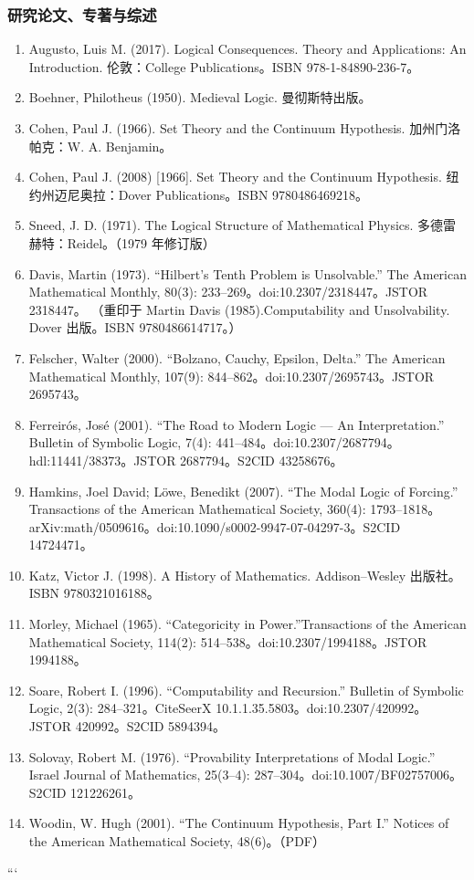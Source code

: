 \subsubsection{研究论文、专著与综述}
\begin{enumerate}
  \item Augusto, Luis M. (2017). Logical Consequences. Theory and Applications: An Introduction. 伦敦：College Publications。ISBN 978-1-84890-236-7。
  \item Boehner, Philotheus (1950). Medieval Logic. 曼彻斯特出版。
  \item Cohen, Paul J. (1966). Set Theory and the Continuum Hypothesis. 加州门洛帕克：W. A. Benjamin。
  \item Cohen, Paul J. (2008) [1966]. Set Theory and the Continuum Hypothesis. 纽约州迈尼奥拉：Dover Publications。ISBN 9780486469218。
  \item Sneed, J. D. (1971). The Logical Structure of Mathematical Physics. 多德雷赫特：Reidel。（1979 年修订版）
  \item Davis, Martin (1973). “Hilbert's Tenth Problem is Unsolvable.” The American Mathematical Monthly, 80(3): 233–269。doi:10.2307/2318447。JSTOR 2318447。  
  （重印于 Martin Davis (1985).Computability and Unsolvability. Dover 出版。ISBN 9780486614717。）
  \item Felscher, Walter (2000). “Bolzano, Cauchy, Epsilon, Delta.” The American Mathematical Monthly, 107(9): 844–862。doi:10.2307/2695743。JSTOR 2695743。
  \item Ferreirós, José (2001). “The Road to Modern Logic — An Interpretation.” Bulletin of Symbolic Logic, 7(4): 441–484。doi:10.2307/2687794。hdl:11441/38373。JSTOR 2687794。S2CID 43258676。
  \item Hamkins, Joel David; Löwe, Benedikt (2007). “The Modal Logic of Forcing.” Transactions of the American Mathematical Society, 360(4): 1793–1818。arXiv:math/0509616。doi:10.1090/s0002-9947-07-04297-3。S2CID 14724471。
  \item Katz, Victor J. (1998). A History of Mathematics. Addison–Wesley 出版社。ISBN 9780321016188。
  \item Morley, Michael (1965). “Categoricity in Power.”Transactions of the American Mathematical Society, 114(2): 514–538。doi:10.2307/1994188。JSTOR 1994188。
  \item Soare, Robert I. (1996). “Computability and Recursion.” Bulletin of Symbolic Logic, 2(3): 284–321。CiteSeerX 10.1.1.35.5803。doi:10.2307/420992。JSTOR 420992。S2CID 5894394。
  \item Solovay, Robert M. (1976). “Provability Interpretations of Modal Logic.” Israel Journal of Mathematics, 25(3–4): 287–304。doi:10.1007/BF02757006。S2CID 121226261。
  \item Woodin, W. Hugh (2001). “The Continuum Hypothesis, Part I.” Notices of the American Mathematical Society, 48(6)。（PDF）
\end{enumerate}
```
